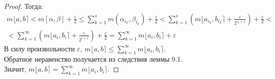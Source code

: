 \documentclass[11pt,a4paper]{report}
\def\eps{\varepsilon}
\theoremstyle{definition}
\theoremstyle{definition}
\theoremstyle{definition}
\begin{document}
\begin{proof}
		Тогда: 
		\begin{gather*}
			 m\lfloor a, b \rceil < m[\alpha, \beta] + \frac{\eps}{2} \le \sum_{k=1}^{s}{m(\alpha_{i_{k}}, \beta_{i_{k}})} + \frac{\eps}{2} < \sum_{k=1}^{s}{\left (m\lfloor a_{i_{k}}, b_{i_{k}}\rceil + \frac{\eps}{2^{i_{k} + 1}}\right )} + \frac{\eps}{2} <\\< \sum_{k=1}^{\infty}{\left (m\lfloor a_{i}, b_{i} \rceil + \frac{\eps}{2^{i + 1}}\right )}  +  \frac{\eps}{2}  =  \sum_{k=1}^{\infty}{m\lfloor a_{i}, b_{i} \rceil }  +  \eps 
		\end{gather*}
		В силу произвольности $ \eps $, $ m\lfloor a, b \rceil \le \sum_{k=1}^{\infty}{m\lfloor a_{i}, b_{i} \rceil } $.\\
		Обратное неравенство получается из следствия леммы 9.1.\\
		Значит, $ m\lfloor a, b \rceil = \sum_{k=1}^{\infty}{m\lfloor a_{i}, b_{i} \rceil } $.
	\end{proof}
\end{document}
